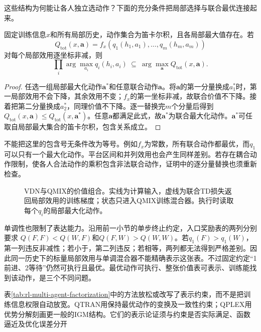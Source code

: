 这些结构为何能让各人独立选动作？下面的充分条件把局部选择与联合最优连接起来。

\begin{theorem}[单调组合的局部贪心充分性]
\label{thm:rl-multi-agent-monotone}
固定训练信息$x$和所有局部历史，动作集合为笛卡尔积，且各局部最大值存在。若
\[
 Q_{\text{tot}}(x,\bm a)
 =f_x(q_1(h_1,a_1),\ldots,q_m(h_m,a_m))
\]
对每个局部效用逐坐标非减，则
\[
 \prod_i\arg\max_{a_i}q_i(h_i,a_i)
 \ \subseteq\ \arg\max_{\bm a}Q_{\text{tot}}(x,\bm a).
\]
\end{theorem}
\begin{proof}
任选一组局部最大化动作$\bm a^*$和任意联合动作$\bm a$。将$\bm a$的第一分量换成$a_1^*$时，第一局部效用不会下降，其余效用不变；$f_x$的第一坐标非减，故联合价值不下降。接着把第二分量换成$a_2^*$，同理价值不下降。逐一替换完$m$个分量后得到
$Q_{\text{tot}}(x,\bm a)\leq Q_{\text{tot}}(x,\bm a^*)$。任意$\bm a$都满足此式，故$\bm a^*$为联合最大化动作。$\bm a^*$可任取自局部最大集合的笛卡尔积，包含关系成立。
\end{proof}

不能把这里的包含号无条件改为等号。例如$f_x$为常数，所有联合动作都最优，而$q_1$可以只有一个最大化动作。平台区间和并列效用也会产生同样差别。若存在耦合动作限制，使各人合法动作的乘积包含非法联合动作，证明中的逐分量替换也须重新检查。

\begin{figure}[htbp]
 \centering
 
 \caption{VDN与QMIX的价值组合。实线为计算输入，虚线为联合TD损失返回局部效用的训练梯度；状态只进入QMIX训练混合器。执行时读取每个$q_i$的局部最大化动作。}
 \label{fig:rl-multi-agent-mixers}
\end{figure}

单调性也限制了表达能力。沿用前一小节的单步终止约定，入口奖励表的两列分别要求
$Q(F,F)<Q(W,F)$和$Q(F,W)>Q(W,W)$。若$q_1(F)>q_1(W)$，第一列违反非减性；若小于，第二列违反；若相等，两列都无法得到严格差别。因此同一历史下的标量局部效用与单调混合器不能精确表示这张表。不过固定约定“1前进、2等待”仍然可执行且最优。最优动作可执行、整张价值表可表示、训练能找到该动作，是三个不同问题。

表\ref{tab:rl-multi-agent-factorization}中的方法放松或改写了表示约束，而不是把训练信息权限自动放宽。QTRAN用保持最优动作的变换及一致性约束；QPLEX用优势分解刻画更一般的IGM结构。它们的表示论证须与约束是否实际满足、函数逼近及优化误差分开

